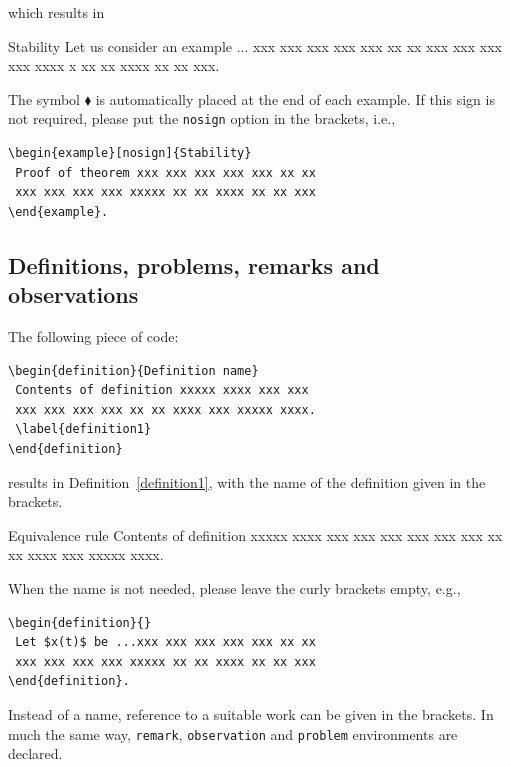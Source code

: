\documentclass{amcs}
\begin{document}
\noindent which results in

\begin{example}[]{Stability}
 Let us consider an example ... xxx xxx xxx
 xxx xxx xx xx xxx xxx xxx xxx xxxx x xx xx
 xxxx xx xx xxx.
\end{example}

\medskip \noindent The symbol $\blacklozenge$ is automatically placed at the end of each example. If this sign is not required, please put the \texttt{nosign} option in the brackets, i.e.,

{\small \begin{verbatim}
\begin{example}[nosign]{Stability}
 Proof of theorem xxx xxx xxx xxx xxx xx xx
 xxx xxx xxx xxx xxxxx xx xx xxxx xx xx xxx
\end{example}.
\end{verbatim}}

\subsection{Definitions, problems, remarks and observations}

The following piece of code:

{\small \begin{verbatim}
\begin{definition}{Definition name}
 Contents of definition xxxxx xxxx xxx xxx
 xxx xxx xxx xxx xx xx xxxx xxx xxxxx xxxx.
 \label{definition1}
\end{definition}
\end{verbatim}}
\noindent results in Definition~\ref{definition1}, with the name of the definition given in the brackets.

\medskip
\begin{definition}{Equivalence rule}
 Contents of definition xxxxx xxxx xxx xxx
 xxx xxx xxx xxx xx xx xxxx xxx xxxxx xxxx.
 \label{definition1}
\end{definition}

\medskip\noindent
When the name is not needed, please leave the curly brackets empty, e.g.,

{\small \begin{verbatim}
\begin{definition}{}
 Let $x(t)$ be ...xxx xxx xxx xxx xxx xx xx
 xxx xxx xxx xxx xxxxx xx xx xxxx xx xx xxx
\end{definition}.
\end{verbatim}}

\noindent Instead of a name, reference to a suitable work can be given in the brackets. In much the same way, \verb+remark+, \verb+observation+ and \verb+problem+ environments are declared.
\end{document}
